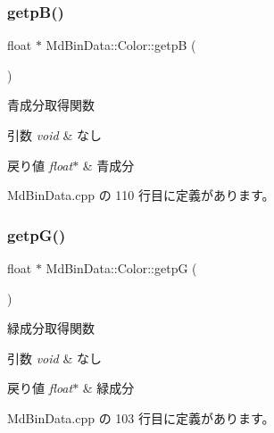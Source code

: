 \subsubsection{\texorpdfstring{getp\+B()}{getpB()}}
{\footnotesize\ttfamily float $\ast$ Md\+Bin\+Data\+::\+Color\+::getpB (\begin{DoxyParamCaption}{ }\end{DoxyParamCaption})}



青成分取得関数 


\begin{DoxyParams}{引数}
{\em void} & なし \\
\hline
\end{DoxyParams}

\begin{DoxyRetVals}{戻り値}
{\em float$\ast$} & 青成分 \\
\hline
\end{DoxyRetVals}


 Md\+Bin\+Data.\+cpp の 110 行目に定義があります。

\mbox{\label{class_md_bin_data_1_1_color_a8d33bc92cef898d6026d8bd1f1fd51b0}} 
\subsubsection{\texorpdfstring{getp\+G()}{getpG()}}
{\footnotesize\ttfamily float $\ast$ Md\+Bin\+Data\+::\+Color\+::getpG (\begin{DoxyParamCaption}{ }\end{DoxyParamCaption})}



緑成分取得関数 


\begin{DoxyParams}{引数}
{\em void} & なし \\
\hline
\end{DoxyParams}

\begin{DoxyRetVals}{戻り値}
{\em float$\ast$} & 緑成分 \\
\hline
\end{DoxyRetVals}


 Md\+Bin\+Data.\+cpp の 103 行目に定義があります。

\mbox{\label{class_md_bin_data_1_1_color_aa4731175fd7438ff0e3d20db51fa87e2}} 
